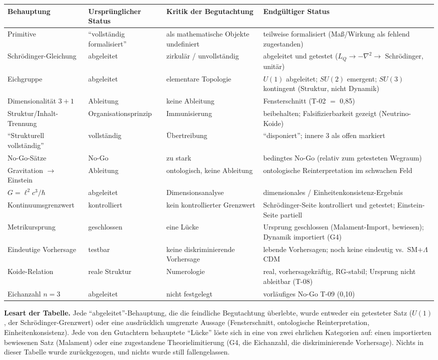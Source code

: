 \documentclass[10pt,twoside,openany]{book}
\begin{document}
\begin{longtable}{p{3.2cm}p{2.4cm}p{3.0cm}p{5.8cm}}
\toprule
Behauptung & Ursprünglicher Status & Kritik der Begutachtung & Endgültiger Status \\
\midrule
\endhead
Primitive & ``vollständig formalisiert'' & als mathematische Objekte undefiniert & teilweise formalisiert (Maß/Wirkung als fehlend zugestanden) \\
Schr\"odinger-Gleichung & abgeleitet & zirkulär / unvollständig & abgeleitet und getestet ($L_Q\to-\nabla^2\to$ Schr\"odinger, unitär) \\
Eichgruppe & abgeleitet & elementare Topologie & $U(1)$ abgeleitet; $SU(2)$ emergent; $SU(3)$ kontingent (Struktur, nicht Dynamik) \\
Dimensionalität $3{+}1$ & Ableitung & keine Ableitung & Fensterschnitt (T-02 $=$ 0,85) \\
Struktur/Inhalt-Trennung & Organisationsprinzip & Immunisierung & beibehalten; Falsifizierbarkeit gezeigt (Neutrino-Koide) \\
``Strukturell vollständig'' & vollständig & Übertreibung & ``disponiert''; innere 3 als offen markiert \\
No-Go-Sätze & No-Go & zu stark & bedingtes No-Go (relativ zum getesteten Wegraum) \\
Gravitation $\to$ Einstein & Ableitung & ontologisch, keine Ableitung & ontologische Reinterpretation im schwachen Feld \\
$G=\ell^2c^3/\hbar$ & abgeleitet & Dimensionsanalyse & dimensionales / Einheitenkonsistenz-Ergebnis \\
Kontinuumsgrenzwert & kontrolliert & kein kontrollierter Grenzwert & Schr\"odinger-Seite kontrolliert und getestet; Einstein-Seite partiell \\
Metrikursprung & geschlossen & eine Lücke & Ursprung geschlossen (Malament-Import, bewiesen); Dynamik importiert (G4) \\
Eindeutige Vorhersage & testbar & keine diskriminierende Vorhersage & lebende Vorhersagen; noch keine eindeutig vs.\ SM$+\Lambda$CDM \\
Koide-Relation & reale Struktur & Numerologie & real, vorhersagekräftig, RG-stabil; Ursprung nicht ableitbar (T-08) \\
Eichanzahl $n=3$ & abgeleitet & nicht festgelegt & vorläufiges No-Go T-09 (0,10) \\
\bottomrule
\end{longtable}

\textbf{Lesart der Tabelle.} Jede ``abgeleitet''-Behauptung, die die feindliche
Begutachtung überlebte, wurde entweder ein getesteter Satz ($U(1)$, der
Schr\"odinger-Grenzwert) oder eine ausdrücklich umgrenzte Aussage (Fensterschnitt,
ontologische Reinterpretation, Einheitenkonsistenz). Jede von den Gutachtern behauptete
``Lücke'' löste sich in eine von zwei ehrlichen Kategorien auf: einen importierten
bewiesenen Satz (Malament) oder eine zugestandene Theorielimitierung (G4, die Eichanzahl,
die diskriminierende Vorhersage). Nichts in dieser Tabelle wurde zurückgezogen, und nichts
wurde still fallengelassen.
\end{document}
